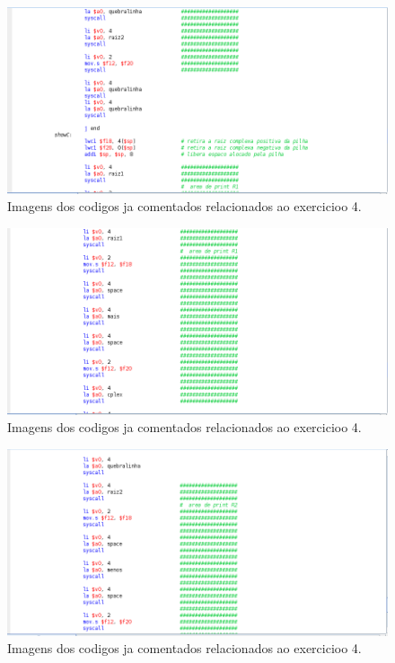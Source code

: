 \documentclass[12pt]{article}
\begin{document}
\begin{figure}[H]
	\centering
	\includegraphics[width=1\textwidth]{EX_4_9.png}
	\caption{Imagens dos codigos ja comentados relacionados ao exercicioo 4.}
	\label{fig:hilo}
\end{figure}

\begin{figure}[H]
	\centering
	\includegraphics[width=1\textwidth]{EX_4_10.png}
	\caption{Imagens dos codigos ja comentados relacionados ao exercicioo 4.}
	\label{fig:hilo}
\end{figure}

\begin{figure}[H] 
	\centering
	\includegraphics[width=1\textwidth]{EX_4_11.png}
	\caption{Imagens dos codigos ja comentados relacionados ao exercicioo 4.}
	\label{fig:hilo}
\end{figure}
\end{document}
